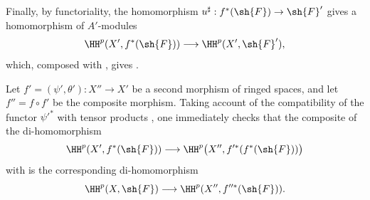 \begin{env}[12.1.3]
Finally, by functoriality, the homomorphism
$u^\sharp:f^*(\sh{F})\to\sh{F}'$ gives a homomorphism of
$A'$-modules
\[
  \HH^p(X',f^*(\sh{F}))
  \longrightarrow
  \HH^p(X',\sh{F}'),
\]
which, composed with , gives
.

Let $f'=(\psi',\theta'):X''\to X'$ be a second morphism of ringed
spaces, and let $f''=f\circ f'$ be the composite morphism.
Taking account of the compatibility of the functor $\psi'^*$ with
tensor products , one immediately
checks that the composite of the di-homomorphism
\[
  \HH^p(X',f^*(\sh{F}))
  \longrightarrow
  \HH^p\bigl(X'',f'^*(f^*(\sh{F}))\bigr)
\]
with  is the corresponding di-homomorphism
\[
  \HH^p(X,\sh{F})
  \longrightarrow
  \HH^p(X'',f''^*(\sh{F})).
\]
\end{env}

